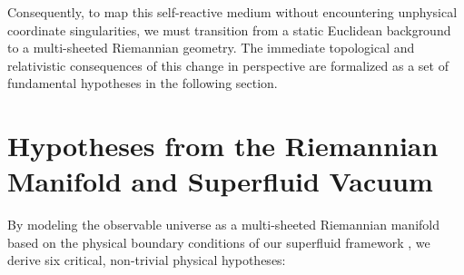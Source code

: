 \documentclass[11pt,a4paper]{article}
\theoremstyle{plain}
\theoremstyle{definition}
\theoremstyle{remark}
\begin{document}
Consequently, to map this self-reactive medium without encountering unphysical coordinate singularities, we must transition from a static Euclidean background to a multi-sheeted Riemannian geometry. The immediate topological and relativistic consequences of this change in perspective are formalized as a set of fundamental hypotheses in the following section.

\newpage
\section{Hypotheses from the Riemannian Manifold and Superfluid Vacuum}
By modeling the observable universe as a multi-sheeted Riemannian manifold based on the physical boundary conditions of our superfluid framework \cite{riemann1857}, we derive six critical, non-trivial physical hypotheses:
\end{document}
